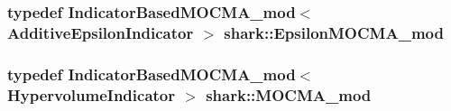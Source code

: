 \subsubsection[{\texorpdfstring{Epsilon\+M\+O\+C\+M\+A\+\_\+mod}{EpsilonMOCMA_mod}}]{\setlength{\rightskip}{0pt plus 5cm}typedef {\bf Indicator\+Based\+M\+O\+C\+M\+A\+\_\+mod}$<$ Additive\+Epsilon\+Indicator $>$ {\bf shark\+::\+Epsilon\+M\+O\+C\+M\+A\+\_\+mod}}\hypertarget{namespaceshark_a80ca1eab4f0f42098141ae4567e38440}{}\label{namespaceshark_a80ca1eab4f0f42098141ae4567e38440}
\subsubsection[{\texorpdfstring{M\+O\+C\+M\+A\+\_\+mod}{MOCMA_mod}}]{\setlength{\rightskip}{0pt plus 5cm}typedef {\bf Indicator\+Based\+M\+O\+C\+M\+A\+\_\+mod}$<$ Hypervolume\+Indicator $>$ {\bf shark\+::\+M\+O\+C\+M\+A\+\_\+mod}}\hypertarget{namespaceshark_a6ed8fe07d749ee30047970d28d6b4bc7}{}\label{namespaceshark_a6ed8fe07d749ee30047970d28d6b4bc7}

